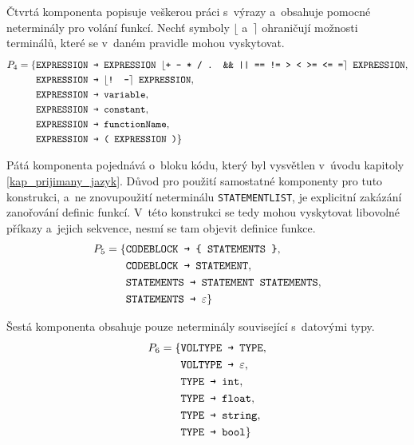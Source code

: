 Čtvrtá komponenta popisuje veškerou práci s~výrazy a~obsahuje pomocné neterminály pro volání funkcí.
Nechť symboly $\lfloor$ a~$\rceil$ ohraničují možnosti terminálů, které se v~daném pravidle mohou vyskytovat.
\begin{equation*}
    P_4 = \{ 
        \begin{aligned}[t] 
            &\texttt{EXPRESSION \textrightarrow{} } \texttt{EXPRESSION } \lfloor \texttt{+ - * / . \&\& || == != > < >= <= =}\rceil \texttt{ EXPRESSION},\\
            &\texttt{EXPRESSION \textrightarrow{} } \lfloor \texttt{! -} \rceil \texttt{ EXPRESSION}, \\
            &\texttt{EXPRESSION \textrightarrow{} } \texttt{variable},\\
            &\texttt{EXPRESSION \textrightarrow{} } \texttt{constant},\\
            &\texttt{EXPRESSION \textrightarrow{} } \texttt{functionName},\\
            &\texttt{EXPRESSION \textrightarrow{} } \texttt{( EXPRESSION )} \}
        \end{aligned}
\end{equation*}

Pátá komponenta pojednává o~bloku kódu, který byl vysvětlen v~úvodu kapitoly \ref{kap_prijimany_jazyk}.
Důvod pro použití samostatné komponenty pro tuto konstrukci, a~ne znovupoužití neterminálu \texttt{STATEMENT\textunderscore LIST}, je explicitní zakázání zanořování definic funkcí.
V~této konstrukci se tedy mohou vyskytovat libovolné příkazy a~jejich sekvence, nesmí se tam objevit definice funkce. 
\begin{equation*}
    P_5 = \{ 
        \begin{aligned}[t] 
            &\texttt{CODEBLOCK \textrightarrow{} } \texttt{\{ STATEMENTS \}},\\
            &\texttt{CODEBLOCK \textrightarrow{} } \texttt{STATEMENT}, \\
            &\texttt{STATEMENTS \textrightarrow{} } \texttt{STATEMENT STATEMENTS},\\
            &\texttt{STATEMENTS \textrightarrow{} } \varepsilon \}
        \end{aligned}
\end{equation*}

Šestá komponenta obsahuje pouze neterminály související s~datovými typy.
\begin{equation*}
    P_6 = \{ 
        \begin{aligned}[t] 
            &\texttt{VOLTYPE \textrightarrow{} } \texttt{TYPE},\\
            &\texttt{VOLTYPE \textrightarrow{} } \varepsilon, \\
            &\texttt{TYPE \textrightarrow{} } \texttt{int},\\
            &\texttt{TYPE \textrightarrow{} } \texttt{float},\\
            &\texttt{TYPE \textrightarrow{} } \texttt{string},\\
            &\texttt{TYPE \textrightarrow{} } \texttt{bool} \}
        \end{aligned}
\end{equation*}

